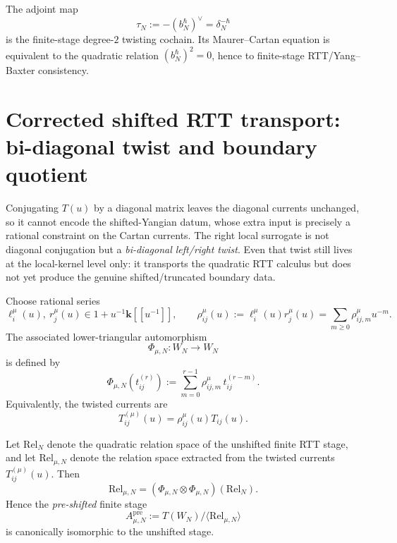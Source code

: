 \begin{corollary}
\label{cor:degree-two-twisting-cochain}
The adjoint map
\[
\tau_N:=-(b_N^\hbar)^\vee=\delta_N^{-\hbar}
\]
is the finite-stage degree-$2$ twisting cochain. Its Maurer--Cartan equation is
equivalent to the quadratic relation $(b_N^\hbar)^2=0$, hence to finite-stage
RTT/Yang--Baxter consistency.
\end{corollary}

\section{Corrected shifted RTT transport: bi-diagonal twist and boundary quotient}
\label{sec:corrected-shifted-rtt-transport}

\begin{remark}
\label{rem:diagonal-conjugation-too-weak}
Conjugating $T(u)$ by a diagonal matrix leaves the diagonal currents unchanged,
so it cannot encode the shifted-Yangian datum, whose extra input is precisely a
rational constraint on the Cartan currents. The right local surrogate is not
diagonal conjugation but a \emph{bi-diagonal left/right twist}. Even that twist
still lives at the local-kernel level only: it transports the quadratic RTT
calculus but does not yet produce the genuine shifted/truncated boundary data.
\end{remark}

\begin{definition}
\label{def:bi-diagonal-twist}
Choose rational series
\[
\ell_i^\mu(u),\ r_j^\mu(u)\in 1+u^{-1}\mathbf{k}[[u^{-1}]],
\qquad
\rho_{ij}^\mu(u):=\ell_i^\mu(u)r_j^\mu(u)
=\sum_{m\ge 0}\rho_{ij,m}^\mu u^{-m}.
\]
The associated lower-triangular automorphism
\[
\Phi_{\mu,N}\colon W_N\to W_N
\]
is defined by
\[
\Phi_{\mu,N}(t_{ij}^{(r)})
:=
\sum_{m=0}^{r-1}\rho_{ij,m}^\mu\,t_{ij}^{(r-m)}.
\]
Equivalently, the twisted currents are
\[
T_{ij}^{(\mu)}(u)=\rho_{ij}^\mu(u)T_{ij}(u).
\]
\end{definition}

\begin{theorem}
\label{thm:transport-of-finite-rtt-relation-space}
Let $\mathrm{Rel}_N$ denote the quadratic relation space of the unshifted finite
RTT stage, and let $\mathrm{Rel}_{\mu,N}$ denote the relation space extracted
from the twisted currents $T_{ij}^{(\mu)}(u)$. Then
\[
\mathrm{Rel}_{\mu,N}=(\Phi_{\mu,N}\otimes \Phi_{\mu,N})(\mathrm{Rel}_N).
\]
Hence the \emph{pre-shifted} finite stage
\[
A_{\mu,N}^{\mathrm{pre}}:=T(W_N)/\langle \mathrm{Rel}_{\mu,N}\rangle
\]
is canonically isomorphic to the unshifted stage.
\end{theorem}

